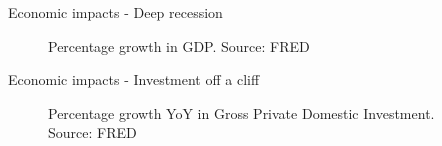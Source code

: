 

\begin{frame}{Economic impacts - Deep recession}

\begin{figure}
\begin{center}


\caption{Percentage growth in GDP. Source: FRED}

\end{center}
\end{figure}

\end{frame}



\begin{frame}{Economic impacts - Investment off a cliff}

\begin{figure}
\begin{center}


\caption{Percentage growth YoY in Gross Private Domestic Investment. Source: FRED}

\end{center}
\end{figure}

\end{frame}

